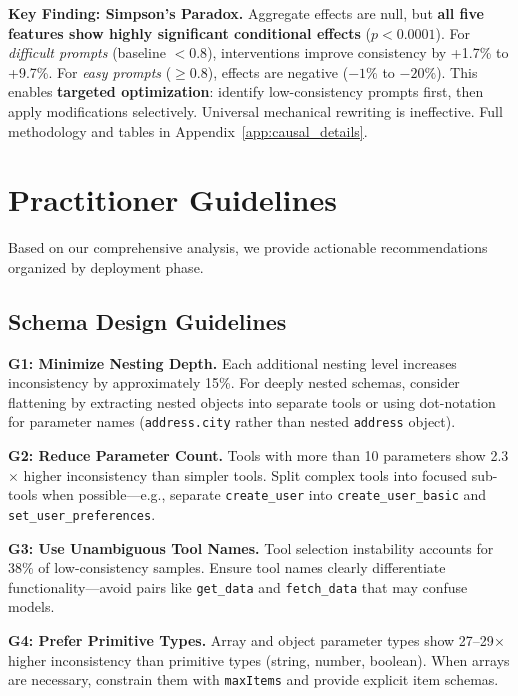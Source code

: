 \documentclass[sigconf,anonymous,review]{acmart}
\begin{document}
\textbf{Key Finding: Simpson's Paradox.} Aggregate effects are null, but \textbf{all five features show highly significant conditional effects} ($p < 0.0001$). For \textit{difficult prompts} (baseline $<0.8$), interventions improve consistency by +1.7\% to +9.7\%. For \textit{easy prompts} ($\geq0.8$), effects are negative ($-1\%$ to $-20\%$). This enables \textbf{targeted optimization}: identify low-consistency prompts first, then apply modifications selectively. Universal mechanical rewriting is ineffective. Full methodology and tables in Appendix~\ref{app:causal_details}.

\section{Practitioner Guidelines}
\label{sec:guidelines}

Based on our comprehensive analysis, we provide actionable recommendations organized by deployment phase.

\subsection{Schema Design Guidelines}

\textbf{G1: Minimize Nesting Depth.} Each additional nesting level increases inconsistency by approximately 15\%. For deeply nested schemas, consider flattening by extracting nested objects into separate tools or using dot-notation for parameter names (\texttt{address.city} rather than nested \texttt{address} object).

\textbf{G2: Reduce Parameter Count.} Tools with more than 10 parameters show 2.3$\times$ higher inconsistency than simpler tools. Split complex tools into focused sub-tools when possible---e.g., separate \texttt{create\_user} into \texttt{create\_user\_basic} and \texttt{set\_user\_preferences}.

\textbf{G3: Use Unambiguous Tool Names.} Tool selection instability accounts for 38\% of low-consistency samples. Ensure tool names clearly differentiate functionality---avoid pairs like \texttt{get\_data} and \texttt{fetch\_data} that may confuse models.

\textbf{G4: Prefer Primitive Types.} Array and object parameter types show 27--29$\times$ higher inconsistency than primitive types (string, number, boolean). When arrays are necessary, constrain them with \texttt{maxItems} and provide explicit item schemas.
\end{document}
